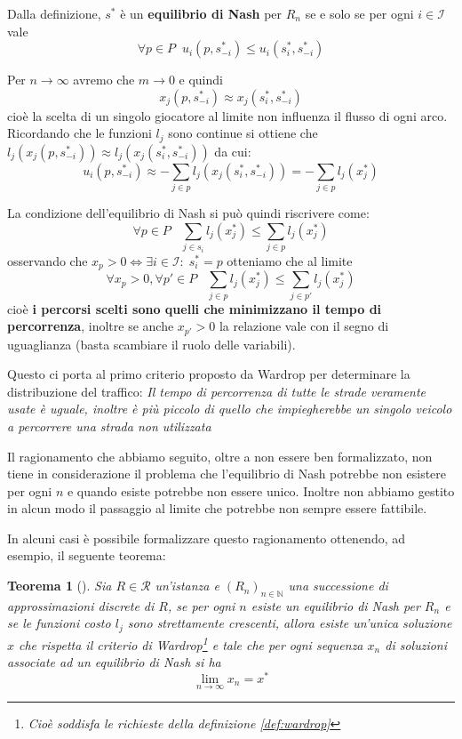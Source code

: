 \documentclass[a4paper]{article}
\theoremstyle{plain}
\newtheorem{myteo}{Teorema}[section]
\theoremstyle{definition}
\theoremstyle{remark}
\newcommand{\pa}[1]{\left(#1\right)}
\begin{document}
Dalla definizione, $s^*$ è un \textbf{equilibrio di Nash} per $R_n$ se
e solo se per ogni $i\in \mathcal{I}$ vale
\[ \forall p\in P \;\; u_i \pa{p,s^*_{-i}} \le u_i\pa{s^*_i,s^*_{-i}} \]

Per $n \to \infty$ avremo che $m\to 0$ e quindi
\[ x_j\pa{p, s^*_{-i}} \approx x_j\pa{s^*_i, s^*_{-i}} \]
cioè la scelta di un singolo giocatore al limite non influenza il
flusso di ogni arco. Ricordando che le funzioni $l_j$ sono continue si
ottiene che
$l_j\pa{x_j\pa{p, s^*_{-i}}} \approx l_j\pa{x_j\pa{s^*_i, s^*_{-i}}}$
da cui:
\[ u_i\pa{p, s^*_{-i}} \approx - \sum_{j\in p} l_j\pa{x_j\pa{s^*_i,
      s^*_{-i}}} = -\sum _{j\in p}l_j\pa{x^*_j} \]

La condizione dell'equilibrio di Nash si può quindi riscrivere come:
\[ \forall p\in P\;\;\; \sum _{j\in s_i}l_j\pa{x^*_j} \le \sum _{j\in
    p}l_j\pa{x^*_j} \]
osservando che $x_p > 0 \Leftrightarrow \exists i\in \mathcal{I}:\;
s^*_i = p$ otteniamo che al limite
\[ \forall x_p >0, \forall p'\in P \;\;\; \sum _{j\in p}l_j\pa{x^*_j}
  \le \sum _{j\in p'}l_j\pa{x^*_j} \]
cioè \textbf{i percorsi scelti sono quelli che minimizzano il tempo di
  percorrenza}, inoltre se anche $x_{p'} > 0$ la relazione vale con il
segno di uguaglianza (basta scambiare il ruolo delle variabili).

Questo ci porta al primo criterio proposto da
Wardrop\cite[pag. 345]{wardrop1952} per determinare la distribuzione
del traffico: \textit{Il tempo di percorrenza di tutte le strade
  veramente usate è uguale, inoltre è più piccolo di quello che
  impiegherebbe un singolo veicolo a percorrere una strada non
  utilizzata}

Il ragionamento che abbiamo seguito, oltre a non essere ben
formalizzato, non tiene in considerazione il problema che l'equilibrio
di Nash potrebbe non esistere per ogni $n$ e quando esiste potrebbe
non essere unico. Inoltre non abbiamo gestito in alcun modo il
passaggio al limite che potrebbe non sempre essere fattibile.

In alcuni casi è possibile formalizzare questo ragionamento ottenendo,
ad esempio, il seguente teorema:
\begin{myteo}[{\cite[Teorema 3.2]{haurie1985}}]
  Sia $R\in \mathcal{R}$ un'istanza e $\pa{R_n}_{n\in \mathbb{N}}$ una
  successione di approssimazioni discrete di $R$, se per ogni $n$
  esiste un equilibrio di Nash per $R_n$ e se le funzioni costo $l_j$
  sono strettamente crescenti, allora esiste un'unica soluzione $x$
  che rispetta il criterio di Wardrop\footnote{Cioè soddisfa le
    richieste della definizione \ref{def:wardrop}} e tale che per ogni
  sequenza $x_n$ di soluzioni associate ad un equilibrio di Nash si ha
  \[ \lim _{n\to \infty} x_n = x^* \]
\end{myteo}
\end{document}
